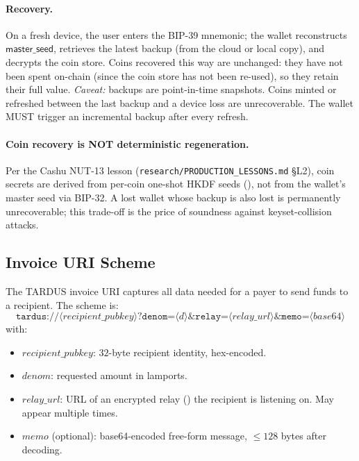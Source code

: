 \paragraph{Recovery.} On a fresh device, the user enters the BIP-39 mnemonic; the wallet reconstructs $\mathsf{master\_seed}$, retrieves the latest backup (from the cloud or local copy), and decrypts the coin store. Coins recovered this way are unchanged: they have not been spent on-chain (since the coin store has not been re-used), so they retain their full value. \emph{Caveat:} backups are point-in-time snapshots. Coins minted or refreshed between the last backup and a device loss are unrecoverable. The wallet MUST trigger an incremental backup after every refresh.

\paragraph{Coin recovery is NOT deterministic regeneration.} Per the Cashu NUT-13 lesson (\texttt{research/PRODUCTION\_LESSONS.md} §L2), coin secrets are derived from per-coin one-shot HKDF seeds (), not from the wallet's master seed via BIP-32. A lost wallet whose backup is also lost is permanently unrecoverable; this trade-off is the price of soundness against keyset-collision attacks.

\subsection{Invoice URI Scheme}
\label{sec:wallet-invoice}

The TARDUS invoice URI captures all data needed for a payer to send funds to a recipient. The scheme is:
\[
  \texttt{tardus://}\langle\mathit{recipient\_pubkey}\rangle\texttt{?denom=}\langle d\rangle\texttt{\&relay=}\langle\mathit{relay\_url}\rangle\texttt{\&memo=}\langle\mathit{base64}\rangle
\]
with:
\begin{itemize}[leftmargin=2em,itemsep=0pt]
  \item $\mathit{recipient\_pubkey}$: $32$-byte recipient identity, hex-encoded.
  \item $\mathit{denom}$: requested amount in lamports.
  \item $\mathit{relay\_url}$: URL of an encrypted relay () the recipient is listening on. May appear multiple times.
  \item $\mathit{memo}$ (optional): base64-encoded free-form message, $\leq 128$ bytes after decoding.
\end{itemize}

